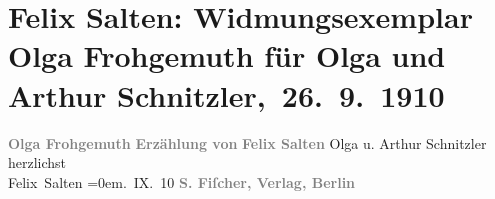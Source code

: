 

         
         \renewcommand{\erwaehntePersonen}{Personen: Felix Salten, Olga Schnitzler}
         \renewcommand{\erwaehnteInstitutionen}{Institutionen: S. Fischer Verlag}
         \renewcommand{\erwaehnteOrte}{Orte: Berlin, Wien}
         \renewcommand{\erwaehnteWerke}{Werke: Olga Frohgemuth. Erzählung}
               \section[ Felix Salten: Widmungsexemplar Olga Frohgemuth für Olga und Arthur Schnitzler, 26. 9. 1910]{ Felix Salten: Widmungsexemplar Olga Frohgemuth für Olga und Arthur
               Schnitzler, 26. 9. 1910}\nopagebreak{}\rehead{ }\begin{ledgroupsized}[t]{13cm}\normalsize\beginnumbering{} \toendnotes[C]{\smallbreak\pagebreak[2]} 
\pstart
           \noindent{}\centering{}{\pb}\textcolor{gray}{\textbf{Olga Frohgemuth}}\pend
           \pstart
           \noindent{}\centering{}\textcolor{gray}{\textbf{Erzählung von}}\pend
           \pstart
           \noindent{}\centering{}\textcolor{gray}{\textbf{Felix Salten}}\pend
           {\bigskip}\pstart
           \noindent{}Olga u. Arthur Schnitzler\pend
           \pstart
           herzlichst{\\[\baselineskip]}\spacefill\mbox{Felix Salten}\pend
           \leftskip=0em{}. IX. 10\pend
           {\bigskip}\pstart
           \noindent{}\centering{}\textcolor{gray}{\textbf{S. Fiſcher, Verlag, Berlin}}\pend
           
         
         \endnumbering{}\end{ledgroupsized}  \newcommand{\dateiname}{L03047}\newcommand{\titel}{Felix Salten: Widmungsexemplar Olga Frohgemuth für Olga und Arthur Schnitzler, 26. 9. 1910}\newcommand{\editorInnen}{Martin Anton Müller und Laura Untner}
      